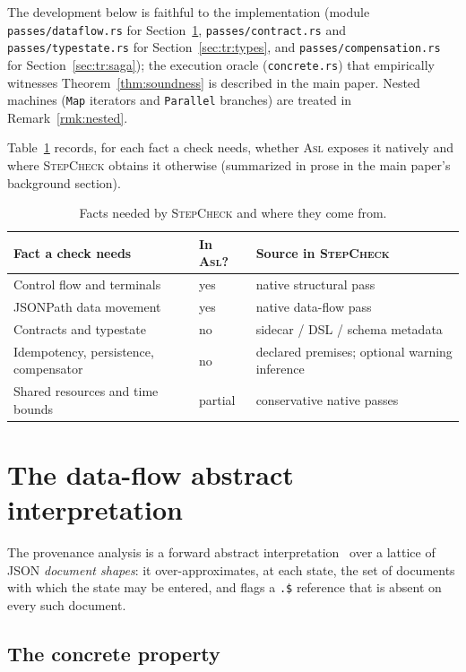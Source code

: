 \documentclass[11pt]{article}
\newcommand{\tool}{\textsc{StepCheck}}
\newcommand{\asl}{\textsc{Asl}}
\theoremstyle{plain}
\theoremstyle{definition}
\theoremstyle{remark}
\begin{document}
The development below is faithful to the implementation (module \texttt{passes/dataflow.rs}
for Section~\ref{sec:tr:df}, \texttt{passes/contract.rs} and \texttt{passes/typestate.rs} for
Section~\ref{sec:tr:types}, and \texttt{passes/compensation.rs} for
Section~\ref{sec:tr:saga}); the execution oracle (\texttt{concrete.rs}) that empirically
witnesses Theorem~\ref{thm:soundness} is described in the main paper. Nested machines
(\texttt{Map} iterators and \texttt{Parallel} branches) are treated in
Remark~\ref{rmk:nested}.

Table~\ref{tab:tr:facts} records, for each fact a check needs, whether \asl{} exposes it
natively and where \tool{} obtains it otherwise (summarized in prose in the main paper's
background section).

\begin{table}[h]
\centering
\begin{tabular}{@{}p{4.6cm}p{2.4cm}p{5.6cm}@{}}
\toprule
\textbf{Fact a check needs} & \textbf{In \asl{}?} & \textbf{Source in \tool{}} \\
\midrule
Control flow and terminals & yes & native structural pass \\
JSONPath data movement & yes & native data-flow pass \\
Contracts and typestate & no & sidecar / DSL / schema metadata \\
Idempotency, persistence, compensator & no & declared premises; optional warning inference \\
Shared resources and time bounds & partial & conservative native passes \\
\bottomrule
\end{tabular}
\caption{Facts needed by \tool{} and where they come from.}
\label{tab:tr:facts}
\end{table}

\section{The data-flow abstract interpretation}
\label{sec:tr:df}

The provenance analysis is a forward abstract interpretation~\cite{cousot1977} over a lattice of
JSON \emph{document shapes}: it over-approximates, at each state, the set of documents with which
the state may be entered, and flags a \texttt{.\$} reference that is absent on every such
document.

\subsection{The concrete property}
\end{document}
